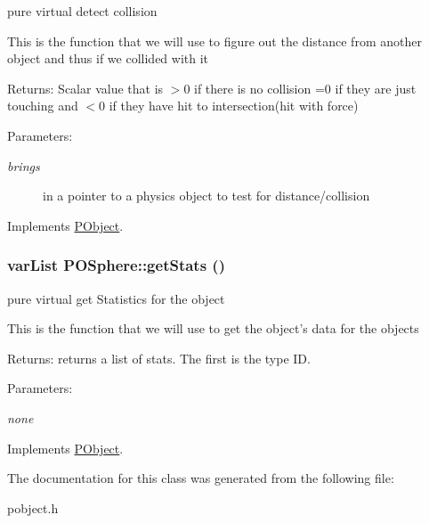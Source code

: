 pure virtual detect collision 

This is the function that we will use to figure out the distance from another object and thus if we collided with it \begin{Desc}
\item[Returns:]Scalar value that is $>$0 if there is no collision =0 if they are just touching and $<$0 if they have hit to intersection(hit with force) \end{Desc}
\begin{Desc}
\item[Parameters:]
\begin{description}
\item[{\em brings}]in a pointer to a physics object to test for distance/collision \end{description}
\end{Desc}


Implements \hyperlink{classPObject_e1828c1830e8e9924ca4c560cbe2f933}{PObject}.\hypertarget{classPOSphere_cab4d5434c63870cd383d38eb985a4fd}{
\subsubsection[getStats]{\setlength{\rightskip}{0pt plus 5cm}varList POSphere::getStats ()}}
\label{classPOSphere_cab4d5434c63870cd383d38eb985a4fd}


pure virtual get Statistics for the object 

This is the function that we will use to get the object's data for the objects \begin{Desc}
\item[Returns:]returns a list of stats. The first is the type ID. \end{Desc}
\begin{Desc}
\item[Parameters:]
\begin{description}
\item[{\em none}]\end{description}
\end{Desc}


Implements \hyperlink{classPObject_4def469478987ead107c777d31790092}{PObject}.

The documentation for this class was generated from the following file:\begin{CompactItemize}
\item 
pobject.h\end{CompactItemize}
